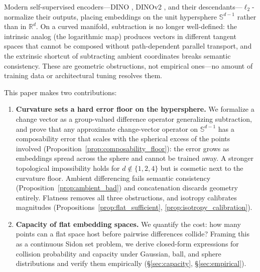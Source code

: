 \documentclass{article}
\newcommand{\R}{\mathbb{R}}
\newcommand{\Sph}{\mathbb{S}}
\newcommand*{\secref}[1]{\hyperref[{#1}]{\S\ref*{#1}}}
\begin{document}
Modern self-supervised encoders---DINO \citep{caron2021emerging}, DINOv2 \citep{oquab2023dinov2}, and their descendants---$\ell_2$-normalize their outputs, placing embeddings on the unit hypersphere $\Sph^{d-1}$ rather than in $\R^d$. On a curved manifold, subtraction is no longer well-defined: the intrinsic analog (the logarithmic map) produces vectors in different tangent spaces that cannot be composed without path-dependent parallel transport, and the extrinsic shortcut of subtracting ambient coordinates breaks semantic consistency. These are geometric obstructions, not empirical ones---no amount of training data or architectural tuning resolves them.

This paper makes two contributions:
\begin{enumerate}
    \item \textbf{Curvature sets a hard error floor on the hypersphere.} We formalize a change vector as a group-valued difference operator generalizing subtraction, and prove that any approximate change-vector operator on $\Sph^{d-1}$ has a composability error that scales with the spherical excess of the points involved (Proposition~\ref{prop:composability_floor}): the error grows as embeddings spread across the sphere and cannot be trained away. A stronger topological impossibility holds for $d \notin \{1,2,4\}$ but is cosmetic next to the curvature floor. Ambient differencing fails semantic consistency (Proposition~\ref{prop:ambient_bad}) and concatenation discards geometry entirely. Flatness removes all three obstructions, and isotropy calibrates magnitudes (Propositions~\ref{prop:flat_sufficient}, \ref{prop:isotropy_calibration}).
    \item \textbf{Capacity of flat embedding spaces.} We quantify the cost: how many points can a flat space host before pairwise differences collide? Framing this as a continuous Sidon set problem, we derive closed-form expressions for collision probability and capacity under Gaussian, ball, and sphere distributions and verify them empirically (\secref{sec:capacity}, \secref{sec:empirical}).
\end{enumerate}

%
\end{document}

